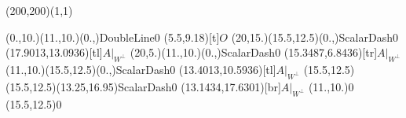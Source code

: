 \unitlength=1bp%

\begin{feynartspicture}(200,200)(1,1)

\FADiagram{}
\FAProp(0.,10.)(11.,10.)(0.,){DoubleLine}{0}
\FALabel(5.5,9.18)[t]{$O$}
\FAProp(20,15.)(15.5,12.5)(0.,){ScalarDash}{0}
\FALabel(17.9013,13.0936)[tl]{$A|_{W^\perp}$}
\FAProp(20,5.)(11.,10.)(0.,){ScalarDash}{0}
\FALabel(15.3487,6.8436)[tr]{$A|_{W^\perp}$}
\FAProp(11.,10.)(15.5,12.5)(0.,){ScalarDash}{0}
\FALabel(13.4013,10.5936)[tl]{$A|_{W^\perp}$}
\FAProp(15.5,12.5)(15.5,12.5)(13.25,16.95){ScalarDash}{0}
\FALabel(13.1434,17.6301)[br]{$A|_{W^\perp}$}
\FAVert(11.,10.){0}
\FAVert(15.5,12.5){0}
\end{feynartspicture}

